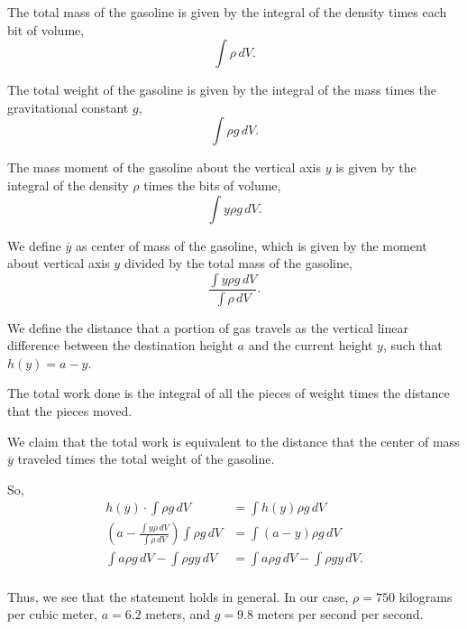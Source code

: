 \documentclass[../hw7]{subfiles}
\begin{document}
The total mass of the gasoline is given by the integral of the density times each bit of volume, \[\int\rho\,dV.\]

The total weight of the gasoline is given by the integral of the mass times the gravitational constant $g$, \[\int\rho g\,dV.\]

The mass moment of the gasoline about the vertical axis $y$ is given by the integral of the density $\rho$ times the bits of volume, \[\int y\rho g\,dV.\]

We define $\overline{y}$ as center of mass of the gasoline, which is given by the moment about vertical axis $y$ divided by the total mass of the gasoline, \[\frac{\int y \rho g\,dV}{\int \rho\,dV}.\]

We define the distance that a portion of gas travels as the vertical linear difference between the destination height $a$ and the current height $y$, such that $h(y)=a-y$.

The total work done is the integral of all the pieces of weight times the distance that the pieces moved.

We claim that the total work is equivalent to the distance that the center of mass $\overline{y}$ traveled times the total weight of the gasoline.

So,
\begin{align*}
    h(\overline{y})\cdot\int\rho g\,dV &= \int h(y) \rho g \, dV \\
    \left(a-\frac{\int y\rho\,dV}{\int \rho\,dV}\right) \int\rho g\,dV &= \int(a-y)\rho g\,dV \\
    \int a\rho g\,dV-\int\rho gy\,dV &= \int a\rho g\,dV-\int\rho gy\,dV. \\
\end{align*} 

Thus, we see that the statement holds in general. In our case, $\rho=750$ kilograms per cubic meter, $a=6.2$ meters, and $g=9.8$ meters per second per second.
\end{document}
